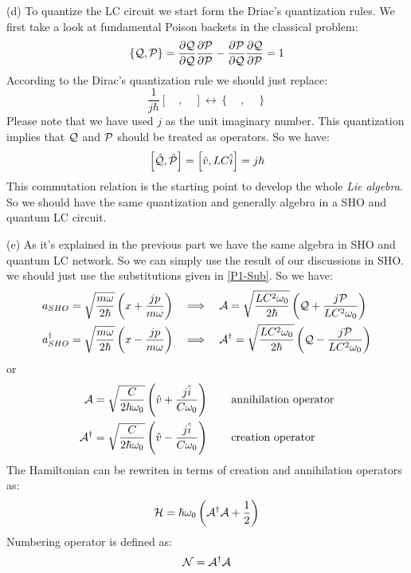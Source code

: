 \begin{homeworkProblem}
\begin{homeworkSection}{(d)}
To quantize the LC circuit we start form the Driac's quantization rules. We first take a look at fundamental Poison backets in the classical problem:
\begin{equation}
\left\{\mathcal{Q},\mathcal{P}\right\}=\dfrac{\partial \mathcal{Q}}{\partial \mathcal{Q}}\dfrac{\partial \mathcal{P}}{\partial \mathcal{P}}-\dfrac{\partial \mathcal{P}}{\partial \mathcal{Q}}\dfrac{\partial \mathcal{Q}}{\partial \mathcal{P}}=1
\end{equation}   
According to the Dirac's quantization rule we should just replace:
\begin{equation}
\frac{1}{j\hbar}\left[\quad ,\quad \right]\leftrightarrow\left\{\quad,\quad\right\}
\end{equation}
Please note that we have used $j$ as the unit imaginary number. This quantization implies that $\mathcal{Q}$ and $\mathcal{P}$ should be treated as operators. So we have:
\begin{equation}
\left[\Hat{\mathcal{Q}},\Hat{\mathcal{P}}\right]=\left[\Hat{v},LC\Hat{i}\right]=j\hbar
\end{equation}
This commutation relation is the starting point to develop the whole \textit{Lie algebra}. So we should have the same quantization and generally algebra in a SHO and quantum LC circuit.
\end{homeworkSection}



\begin{homeworkSection}{(e)} 
As it's explained in the previous part we have the same algebra in SHO and quantum LC network. So we can simply use the result of our discussions in SHO. we should just use the substitutions given in \eqref{P1-Sub}. So we have:
\begin{align}
&a_{SHO}=\sqrt{\frac{m\omega}{2\hbar}}\left(x+\frac{jp}{m\omega}\right)\quad\Longrightarrow\quad 
\mathcal{A}=\sqrt{\frac{LC^2\omega_0}{2\hbar}}\left(\mathcal{Q}+\frac{j\mathcal{P}}{LC^2\omega_0}\right)\\
&a^\dagger_{SHO}=\sqrt{\frac{m\omega}{2\hbar}}\left(x-\frac{jp}{m\omega}\right)\quad\Longrightarrow\quad 
\mathcal{A}^{\dagger}=\sqrt{\frac{LC^2\omega_0}{2\hbar}}\left(\mathcal{Q}-\frac{j\mathcal{P}}{LC^2\omega_0}\right)
\end{align}
 or
 \begin{align}
 \mathcal{A}&=\sqrt{\frac{C}{2\hbar\omega_0}}\left(\Hat{v}+\frac{j\Hat{i}}{C\omega_0}\right)\qquad \text{annihilation operator}\label{P1-111}\\
 \mathcal{A}^{\dagger}&=\sqrt{\frac{C}{2\hbar\omega_0}}\left(\Hat{v}-\frac{j\Hat{i}}{C\omega_0}\right)\qquad\text{creation operator}\label{P1-112}
 \end{align}
The Hamiltonian can be rewriten in terms of creation and annihilation operators as:
\begin{equation}
\mathcal{H}=\hbar \omega_0\left(\mathcal{A}^{\dagger}\mathcal{A}+\frac{1}{2}\right)
\end{equation}
Numbering operator is defined as:
\begin{equation}
\mathcal{N}=\mathcal{A}^{\dagger}\mathcal{A}
\end{equation}


\end{homeworkSection}
\end{homeworkProblem}
